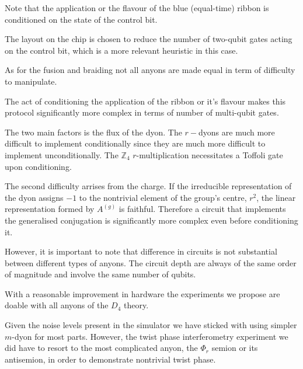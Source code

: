 \documentclass[two column]{article}
\begin{document}
Note that the application or the flavour of the blue (equal-time) ribbon is conditioned on the state of the control bit.

The layout on the chip is chosen to reduce the number of two-qubit gates acting on the control bit, which is a more relevant heuristic in this case.

As for the fusion and braiding not all anyons are made equal in term of difficulty to manipulate.

The act of conditioning the application of the ribbon or it's flavour makes this protocol significantly more complex in terms of number of multi-qubit gates.

The two main factors is the flux of the dyon. The $r-$dyons are much more difficult to implement conditionally since they are much more difficult to implement unconditionally. The $\mathbb{Z}_4$ $r$-multiplication necessitates a Toffoli gate upon conditioning.

The second difficulty arrises from the charge. If the irreducible representation of the dyon assigns $-1$ to the nontrivial element of the group's centre, $r^2$, the linear representation formed by $A^{(g)}$ is faithful. Therefore a circuit that implements the generalised conjugation is significantly more complex even before conditioning it.

However, it is important to note that difference in circuits is not  substantial between different types of anyons. The circuit depth are always of the same order of magnitude and involve the same number of qubits. 

With a reasonable improvement in hardware the experiments we propose are doable with all anyons of the $D_4$ theory. 

Given the noise levels present in the simulator we have sticked with using simpler $m$-dyon for most parts. However, the twist phase interferometry experiment we did have to resort to the most complicated anyon, the $\Phi_r$ semion or its antisemion, in order to demonstrate nontrivial twist phase.
\end{document}
